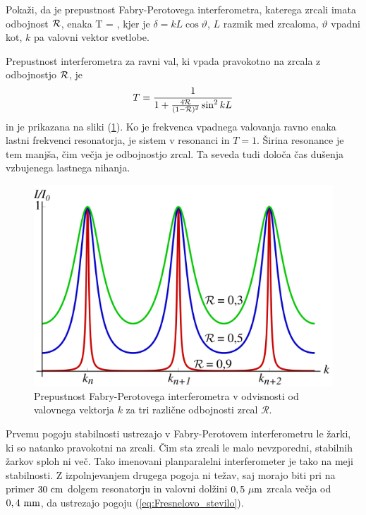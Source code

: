 \begin{definition}
Pokaži, da je prepustnost Fabry-Perotovega interferometra, katerega zrcali imata odbojnost $\cal{R}$, enaka 
\beq
T = ,
\eeq
kjer je $\delta = kL\cos{\vartheta}$, $L$ razmik med zrcaloma, $\vartheta$ vpadni kot, 
$k$ pa valovni vektor svetlobe.
\end{definition}

\noindent
Prepustnost interferometra za ravni val, ki vpada pravokotno na zrcala z
odbojnostjo ${\cal R}$, je 
\begin{equation}
T=\frac{1}{1+\frac{4{\cal R}}{(1-{\cal R})^{2}}\sin^{2}kL}
\label{eq:Fabry-Perot-prepustnost}
\end{equation}
in je prikazana na sliki (\ref{fig:Fabry-Perot}).
Ko je frekvenca vpadnega valovanja ravno enaka lastni frekvenci
resonatorja, je sistem v resonanci in  $T=1$. Širina resonance je tem manjša, čim
večja je odbojnostjo zrcal. Ta seveda tudi določa čas dušenja vzbujenega
lastnega nihanja.\\
\begin{figure}[h]
\centering
\includegraphics[width=9truecm]{slike/04_fabry_perot.png}
\caption{
Prepustnost Fabry-Perotovega interferometra
v odvisnosti od valovnega vektorja $k$ za tri različne odbojnosti zrcal
$\mathcal{R}.$}
\label{fig:Fabry-Perot}
\end{figure}

\noindent
Prvemu pogoju stabilnosti ustrezajo v Fabry-Perotovem interferometru
le žarki, ki so natanko pravokotni na zrcali. Čim sta zrcali le
malo nevzporedni, stabilnih žarkov sploh ni več. Tako imenovani planparalelni 
interferometer je tako na meji stabilnosti. Z izpolnjevanjem drugega
pogoja ni težav, saj morajo biti pri na primer $30~\centi\metre$ dolgem resonatorju in 
valovni dolžini $0,5~\mu\metre$ zrcala večja od $0,4~\milli\metre$, da ustrezajo pogoju
(\ref{eq:Fresnelovo_stevilo}).\\

